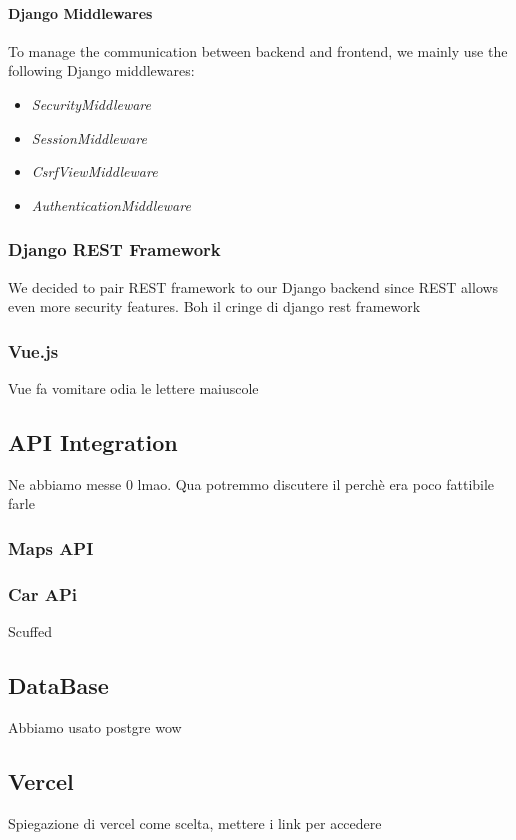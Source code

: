 \documentclass[table, 12pt]{article}
\begin{document}
\paragraph{Django Middlewares}
To manage the communication between backend and frontend, we mainly use the following Django middlewares:
\begin{itemize}
    \item \textit{SecurityMiddleware}
    \item \textit{SessionMiddleware}
    \item \textit{CsrfViewMiddleware}
    \item \textit{AuthenticationMiddleware}
\end{itemize}

\subsubsection{Django REST Framework}
\label{REST}
We decided to pair REST framework to our Django backend since REST allows even more security features.
Boh il cringe di django rest framework


\subsubsection{Vue.js}
\label{Vue}
Vue fa vomitare odia le lettere maiuscole 

\subsection{API Integration}
Ne abbiamo messe 0 lmao. Qua potremmo discutere il perchè era poco fattibile farle 
\subsubsection{Maps API}
\subsubsection{Car APi}
Scuffed

\subsection{DataBase}
Abbiamo usato postgre wow


\subsection{Vercel}
Spiegazione di vercel come scelta, mettere i link per accedere
\end{document}
